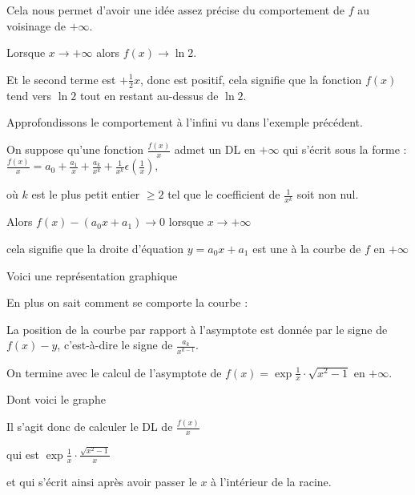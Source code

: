 \change

Cela nous permet d'avoir une idée assez précise du comportement de $f$ au voisinage de $+\infty$.

Lorsque $x\to +\infty$ alors $f(x)\to \ln2$.

Et le second terme est $+\frac 12x$, donc est positif, cela signifie
que la fonction $f(x)$ tend vers $\ln 2$ tout en restant au-dessus de $\ln 2$.


\diapo

Approfondissons le comportement à l'infini vu dans l'exemple précédent.

On suppose qu'une fonction $\frac{f(x)}{x}$
admet un DL en  $+\infty$ qui s'écrit sous la forme :
$\frac{f(x)}{x}= a_0 +\frac{a_1}{x}+\frac{a_k}{x^k}+\frac{1}{x^k}\epsilon(\frac{1}{x}),$  

où $k$ est le plus petit entier $\ge 2$ tel que le coefficient de  $\frac{1}{x^k}$ soit
non nul. 

\change

Alors $f(x)-(a_0x+a_1) \to 0$ lorsque $x\to +\infty$

cela signifie que la droite d'équation $y= a_0x+a_1$ est une  
à la courbe de $f$ en $+\infty$ 

\change

Voici une représentation graphique

\change

En plus on sait comment se comporte la courbe :

La position de la courbe par rapport à 
l'asymptote est donnée par le signe de $f(x)-y$, 
c'est-à-dire le signe de $\frac{a_k}{x^{k-1}}$.

\diapo

On termine avec le calcul de l'asymptote de  $f(x)=\exp{\frac1x} \cdot \sqrt{x^2-1}$
en $+\infty$.

\change

Dont voici le graphe


\change

Il s'agit donc de calculer le DL de $\frac{f(x)}{x}$

\change 

qui est $\exp{\frac1x} \cdot\frac{\sqrt{x^2-1}}{x}$

\change

et qui s'écrit ainsi après avoir passer le $x$ à l'intérieur de la racine.

